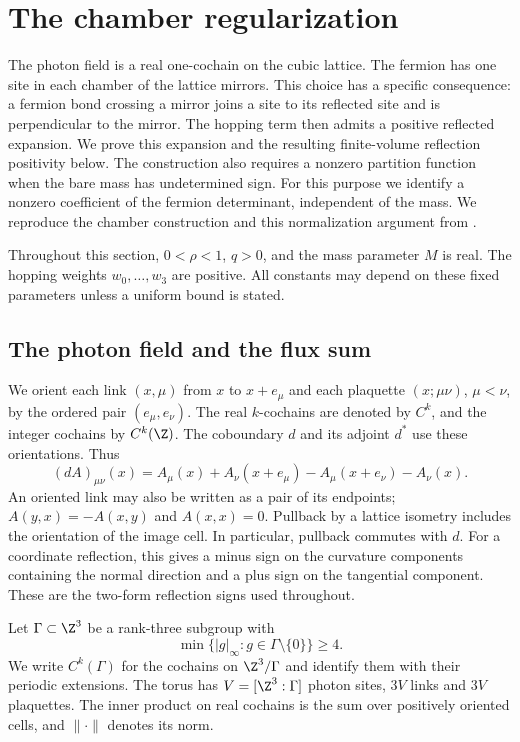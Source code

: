 \section{The chamber regularization}\label{sec:regularization}

The photon field is a real one-cochain on the cubic lattice. The fermion
has one site in each chamber of the lattice mirrors. This choice has a
specific consequence: a fermion bond crossing a mirror joins a site to
its reflected site and is perpendicular to the mirror. The hopping term
then admits a positive reflected expansion. We prove this expansion and
the resulting finite-volume reflection positivity below. The construction
also requires a nonzero partition function when the bare mass has
undetermined sign. For this purpose we identify a nonzero coefficient
of the fermion determinant, independent of the mass. We reproduce the
chamber construction and this normalization argument from
\cite[Sections~2.1--2.3, 3.1--3.5 and 4.1--4.4]{ChamberQED}.

Throughout this section, $0<\rho<1$, $q>0$, and the mass parameter $M$
is real. The hopping weights $w_0,\ldots,w_3$ are positive. All constants may depend on these fixed parameters unless a uniform
bound is stated.

\subsection{The photon field and the flux sum}\label{subsec:reg-photon}

We orient each link $(x,\mu)$ from $x$ to $x+e_\mu$ and each plaquette
$(x;\mu\nu)$, $\mu<\nu$, by the ordered pair $(e_\mu,e_\nu)$.
The real $k$-cochains are denoted by $C^k$, and the integer cochains by
$C^k(\Z)$. The coboundary $d$ and its adjoint $d^*$ use these
orientations. Thus
\begin{equation}\label{eq:reg-coboundary}
 (dA)_{\mu\nu}(x)=A_\mu(x)+A_\nu(x+e_\mu)
                     -A_\mu(x+e_\nu)-A_\nu(x).
\end{equation}
An oriented link may also be written as a pair of its endpoints;
$A(y,x)=-A(x,y)$ and $A(x,x)=0$. Pullback by a lattice isometry includes
the orientation of the image cell. In particular, pullback commutes
with $d$. For a coordinate reflection, this gives a minus sign on
the curvature components containing the normal direction and a
plus sign on the tangential component. These are the two-form
reflection signs used throughout.

Let $\Gamma\subset\Z^3$ be a rank-three subgroup with
\[
 \min\{|g|_\infty:g\in\Gamma\setminus\{0\}\}\ge4.
\]
We write $C^k(\Gamma)$ for the cochains on $\Z^3/\Gamma$ and identify
them with their periodic extensions. The torus has
$V=[\Z^3:\Gamma]$ photon sites, $3V$ links and $3V$ plaquettes. The
inner product on real cochains is the sum over positively oriented
cells, and $\|\cdot\|$ denotes its norm.

